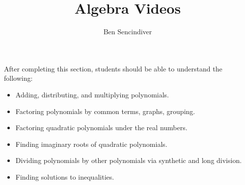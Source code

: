 \documentclass{ximera}
\title{Algebra Videos}
\author{Ben Sencindiver}
\begin{document}
\begin{abstract}
\end{abstract}

\maketitle

\begin{sectionOutcomes}
After completing this section, students should be able to understand the following:

\begin{itemize}
    \item Adding, distributing, and multiplying polynomials.
    \item Factoring polynomials by common terms, graphs, grouping.
    \item Factoring quadratic polynomials under the real numbers.
    \item Finding imaginary roots of quadratic polynomials.
    \item Dividing polynomials by other polynomials via synthetic and long division.
    \item Finding solutions to inequalities.
\end{itemize}


\end{sectionOutcomes}
\end{document}
